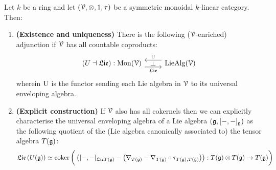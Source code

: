         \begin{theorem} \label{theorem: universal_enveloping_algebras_universal_property}
             Let $k$ be a ring and let $(\calV, \tensor, 1, \tau)$ be a symmetric monoidal $k$-linear category. Then:
                \begin{enumerate}
                    \item \textbf{(Existence and uniqueness)} There is the following ($\mathcal{V}$-enriched) adjunction if $\mathcal{V}$ has all countable coproducts:
                        $$
                            \begin{tikzcd}
                            	{(U \ladjoint \frakLie): \Mon(\calV)} & {\Lie\Alg(\calV)}
                            	\arrow["{\frakLie}"{name=0, swap}, from=1-1, to=1-2, shift right=2]
                            	\arrow["{\U}"{name=1, swap}, from=1-2, to=1-1, shift right=2]
                            	\arrow["\dashv"{rotate=-90}, from=1, to=0, phantom]
                            \end{tikzcd}
                        $$
                    wherein $\mathrm{U}$ is the functor sending each Lie algebra in $\mathcal{V}$ to its universal enveloping algebra.
                    \item \textbf{(Explicit construction)} If $\mathcal{V}$ also has all cokernels then we can explicitly characterise the universal enveloping algebra of a Lie algebra $\left(\mathfrak{g}, [-,-]_{\mathfrak{g}}\right)$ as the following quotient of the (Lie algebra canonically associated to) the tensor algebra $T(\mathfrak{g})$:
                        $$\frakLie\left(U(\g)\right) \cong \coker \bigg(\left([-,-]_{\frakLie T(\g)} - \left(\nabla_{T(\g)} - \nabla_{T(\g)} \circ \tau_{T(\g), T(\g)}\right)\right): T(\g) \tensor T(\g) \to T(\g)\bigg)$$
                \end{enumerate}
        \end{theorem}
